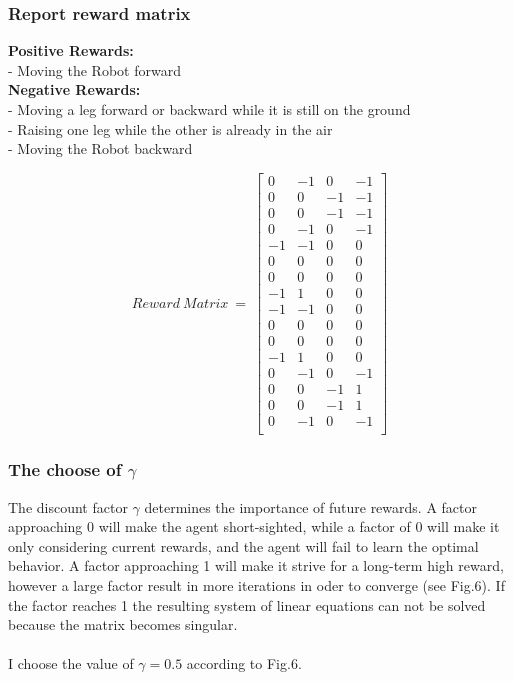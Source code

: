 \documentclass{article}
\begin{document}
\subsubsection{Report reward matrix}
\textbf{Positive Rewards:}
\\
- Moving the Robot forward
\\
\textbf{Negative Rewards:}
\\
- Moving a leg forward or backward while it is still on the ground
\\
- Raising one leg while the other is already in the air
\\
- Moving the Robot backward
\begin{center}
$$
Reward \ Matrix \ = \
\begin{bmatrix}		
0 & -1 & 0 & -1 \\
0 & 0 & -1 & -1 \\ 
0 & 0 & -1 & -1 \\ 
0 & -1 & 0 & -1 \\ 
-1 & -1 & 0 & 0 \\ 
0 & 0 & 0 & 0 \\ 
0 & 0 & 0 & 0 \\ 
-1 & 1 & 0 & 0 \\ 
-1 & -1 & 0 & 0 \\ 
0 & 0 & 0 & 0 \\ 
0 & 0 & 0 & 0 \\ 
-1 & 1 & 0 & 0 \\ 
0 & -1 & 0 & -1 \\ 
0 & 0 & -1 & 1 \\ 
0 & 0 & -1 & 1 \\ 
0 & -1 & 0 & -1 \\ 
\end{bmatrix}
$$	
\end{center}
\subsubsection{The choose of $\gamma$}
The discount factor $\gamma$ determines the importance of future rewards. A factor approaching 0 will make the agent short-sighted, while a factor of 0 will make it only considering current rewards, and the agent will fail to learn the optimal behavior. A factor approaching 1 will make it strive for a long-term high reward, however a large factor result in more iterations in oder to converge (see Fig.6). If the factor reaches 1 the resulting system of linear equations can not be solved because the matrix becomes singular.
\\ \\
I choose the value of $\gamma = 0.5$ according to Fig.6. 
\end{document}
